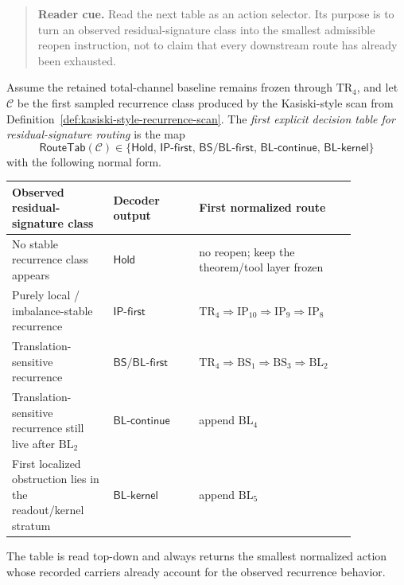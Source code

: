 \begin{quote}\small
\noindent\textbf{Reader cue.} Read the next table as an action selector. Its purpose is to turn an observed residual-signature class into the smallest admissible reopen instruction, not to claim that every downstream route has already been exhausted.
\end{quote}

\begin{definition}
\label{def:first-explicit-decision-table-residual-signature-routing}
Assume the retained total-channel baseline remains frozen through \(\mathrm{TR}_4\), and let \(\mathcal C\) be the first sampled recurrence class produced by the Kasiski-style scan from Definition~\ref{def:kasiski-style-recurrence-scan}. The \emph{first explicit decision table for residual-signature routing} is the map
\[
\mathsf{RouteTab}(\mathcal C)\in \bigl\{\mathsf{Hold},\,\mathsf{IP\text{-}first},\,\mathsf{BS/BL\text{-}first},\,\mathsf{BL\text{-}continue},\,\mathsf{BL\text{-}kernel}\bigr\}
\]
with the following normal form.

\begin{center}
\renewcommand{\arraystretch}{1.2}
\begin{tabular}{>{\raggedright\arraybackslash}p{0.26\linewidth} >{\raggedright\arraybackslash}p{0.22\linewidth} >{\raggedright\arraybackslash}p{0.38\linewidth}}
\toprule
Observed residual-signature class & Decoder output & First normalized route \\
\midrule
No stable recurrence class appears & \(\mathsf{Hold}\) & no reopen; keep the theorem/tool layer frozen \\
Purely local / imbalance-stable recurrence & \(\mathsf{IP\text{-}first}\) & \(\mathrm{TR}_4 \Rightarrow \mathrm{IP}_{10} \Rightarrow \mathrm{IP}_9 \Rightarrow \mathrm{IP}_8\) \\
Translation-sensitive recurrence & \(\mathsf{BS/BL\text{-}first}\) & \(\mathrm{TR}_4 \Rightarrow \mathrm{BS}_1 \Rightarrow \mathrm{BS}_3 \Rightarrow \mathrm{BL}_2\) \\
Translation-sensitive recurrence still live after \(\mathrm{BL}_2\) & \(\mathsf{BL\text{-}continue}\) & append \(\mathrm{BL}_4\) \\
First localized obstruction lies in the readout/kernel stratum & \(\mathsf{BL\text{-}kernel}\) & append \(\mathrm{BL}_5\) \\
\bottomrule
\end{tabular}
\end{center}

The table is read top-down and always returns the smallest normalized action whose recorded carriers already account for the observed recurrence behavior.
\end{definition}

